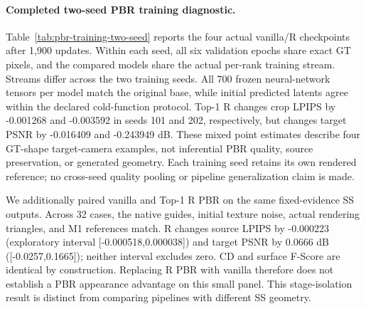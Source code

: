 \documentclass[10pt]{article}
\begin{document}
\paragraph{Completed two-seed PBR training diagnostic.}
Table~\ref{tab:pbr-training-two-seed} reports the four actual vanilla/R
checkpoints after 1,900 updates. Within each seed, all six validation epochs
share exact GT pixels, and the compared models share the actual per-rank
training stream. Streams differ across the two training seeds. All 700
frozen neural-network tensors per model match the original base, while
initial predicted latents agree within the declared cold-function protocol.
Top-1 R changes crop LPIPS by -0.001268 and -0.003592 in seeds 101 and 202,
respectively, but changes target PSNR by -0.016409 and -0.243949 dB.
These mixed point estimates describe four GT-shape target-camera examples,
not inferential PBR quality, source preservation, or generated geometry.
Each training seed retains its own rendered reference; no cross-seed
quality pooling or pipeline generalization claim is made.


We additionally paired vanilla and Top-1 R PBR on the same fixed-evidence SS
outputs. Across 32 cases, the native guides, initial texture noise, actual
rendering triangles, and M1 references match. R changes source LPIPS by
-0.000223 (exploratory interval [-0.000518,0.000038]) and target PSNR by
0.0666 dB ([-0.0257,0.1665]); neither interval excludes zero. CD and surface
F-Score are identical by construction. Replacing R PBR with vanilla therefore
does not establish a PBR appearance advantage on this small panel. This
stage-isolation result is distinct from comparing pipelines
with different SS geometry.


\end{document}
